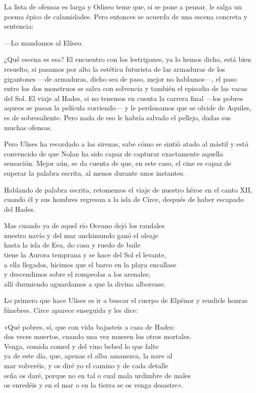 La lista de ofensas es larga y Odiseo teme que, si se pone a pensar, le salga un poema épico de calamidades. Pero entonces se acuerda de una escena concreta y sentencia:

---Lo mandamos al Elíseo.

¿Qué escena es esa? El encuentro con los lestrigones, ya lo hemos dicho, está bien resuelto, si pasamos por alto la estética futurista de las armaduras de los gigantones ---de armaduras, dicho sea de paso, mejor no hablamos---, el paso entre los dos monstruos se salva con solvencia y también el episodio de las vacas del Sol. El viaje al Hades, si no tenemos en cuenta la carrera final ---los pobres aqueos se pasan la película corriendo--- y le perdonamos que se olvide de Aquiles, es de sobresaliente. Pero nada de eso le habría salvado el pellejo, dadas sus muchas ofensas.

Pero Ulises ha recordado a las sirenas, sabe cómo se sintió atado al mástil y está convencido de que Nolan ha sido capaz de capturar exactamente aquella sensación. Mejor aún, se da cuenta de que, en este caso, el cine es capaz de superar la palabra escrita, al menos durante unos instantes.

Hablando de palabra escrita, retomemos el viaje de nuestro héroe en el canto XII, cuando él y sus hombres regresan a la isla de Circe, después de haber escapado del Hades.

\begin{versocita}
Mas cuando ya de aquel río Oceano dejó los raudales\\
nuestro navío y del mar anchimundo ganó el oleaje\\
hasta la isla de Eea, do casa y ruedo de baile\\
tiene la Aurora temprana y se hace del Sol el levante,\\
a ella llegados, hicimos que el barco en la playa encallase\\
y descendimos sobre el rompeolas a los arenales;\\
allí durmiendo aguardamos a que la divina alborease.
\end{versocita}

Lo primero que hace Ulises es ir a buscar el cuerpo de Elpénor y rendirle honras fúnebres. Circe aparece enseguida y les dice:

\begin{versocita}
«Qué pobres, sí, que con vida bajasteis a casa de Hades:\\
dos veces muertos, cuando una vez mueren los otros mortales.\\
Venga, comida comed y del vino bebed lo que falte\\
ya de este día, que, apenas el alba amanezca, la nave al\\
mar volveréis, y os diré yo el camino y de cada detalle\\
seña os daré, porque no en tal o cual mala urdimbre de males\\
os enredéis y en el mar o en la tierra se os venga desastre».
\end{versocita}

